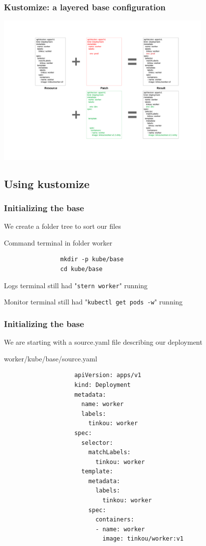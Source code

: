 	\begin{frame}
		\frametitle{Kustomize: a layered base configuration}
		
		\begin{center}
		\includegraphics[height=7.5cm]{../../../resources/color/layeredConfiguration.pdf}
		\end{center}
	\end{frame}

\subsection{Using kustomize}	
	\begin{frame}[fragile]
		\frametitle{Initializing the base}
		
		We create a folder tree to sort our files
		\begin{block}{Command terminal in folder worker}
			\begin{verbatim}
				mkdir -p kube/base
				cd kube/base
			\end{verbatim}
		\end{block}
		
		\bigskip
		
		\begin{footnotesize}
			Logs terminal still had "\verb!stern worker!" running
			
			Monitor terminal still had "\verb!kubectl get pods -w!" running
		\end{footnotesize}
	\end{frame}
	
	\begin{frame}[fragile]
		\frametitle{Initializing the base}
		
		We are starting with a source.yaml file describing our deployment
		\begin{block}{worker/kube/base/source.yaml}
			\begin{tiny}
				\begin{verbatim}
					apiVersion: apps/v1
					kind: Deployment
					metadata:
					  name: worker
					  labels:
					    tinkou: worker
					spec:
					  selector:
					    matchLabels:
					      tinkou: worker
					  template:
					    metadata:
					      labels:
					        tinkou: worker
					    spec:
					      containers:
					      - name: worker
					        image: tinkou/worker:v1
				\end{verbatim}
			\end{tiny}
		\end{block}
	\end{frame}
	
